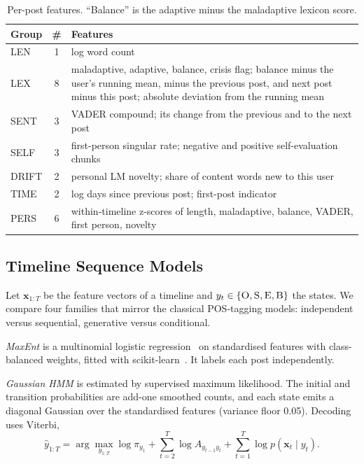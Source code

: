 \documentclass[runningheads]{llncs}
\newcommand{\state}[1]{\textsc{#1}}
\begin{document}
\begin{table}[t]
\caption{Per-post features. ``Balance'' is the adaptive minus the maladaptive lexicon score.}
\label{tab:features}
\centering\small
\begin{tabular}{@{}lcp{}@{}}
\toprule
Group & \# & Features \\
\midrule
LEN   & 1 & log word count \\
LEX   & 8 & maladaptive, adaptive, balance, crisis flag; balance minus the user's running mean, minus the previous post, and next post minus this post; absolute deviation from the running mean \\
SENT  & 3 & VADER compound; its change from the previous and to the next post \\
SELF  & 3 & first-person singular rate; negative and positive self-evaluation chunks \\
DRIFT & 2 & personal LM novelty; share of content words new to this user \\
TIME  & 2 & log days since previous post; first-post indicator \\
PERS  & 6 & within-timeline z-scores of length, maladaptive, balance, VADER, first person, novelty \\
\bottomrule
\end{tabular}
\end{table}

\subsection{Timeline Sequence Models}

Let $\mathbf{x}_{1:T}$ be the feature vectors of a timeline and $y_t \in \{\state{O},\state{S},\state{E},\state{B}\}$ the states. We compare four families that mirror the classical POS-tagging models: independent versus sequential, generative versus conditional.

\emph{MaxEnt} is a multinomial logistic regression~\cite{berger1996maximum} on standardised features with class-balanced weights, fitted with scikit-learn~\cite{pedregosa2011scikit}. It labels each post independently.

\emph{Gaussian HMM} is estimated by supervised maximum likelihood. The initial and transition probabilities are add-one smoothed counts, and each state emits a diagonal Gaussian over the standardised features (variance floor 0.05). Decoding uses Viterbi,
\begin{equation}
\hat{y}_{1:T} = \arg\max_{y_{1:T}} \log \pi_{y_1} + \sum_{t=2}^{T} \log A_{y_{t-1} y_t} + \sum_{t=1}^{T} \log p(\mathbf{x}_t \mid y_t).
\end{equation}
\end{document}
